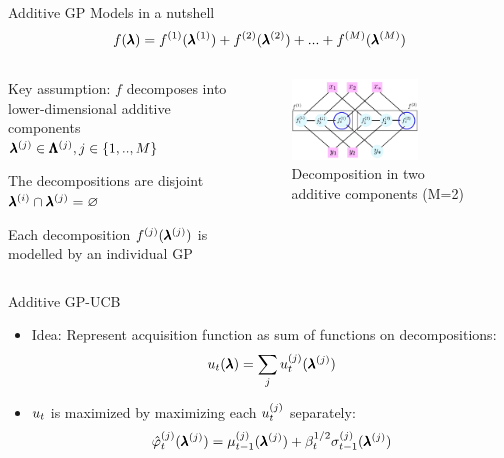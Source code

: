 \begin{frame}{Additive GP Models in a nutshell}
        \begin{equation*}
            f(\pmb{\lambda})=f^{(1)}(\pmb{\lambda}^{(1)})+f^{(2)}(\pmb{\lambda}^{(2)})+...+f^{(M)}(\pmb{\lambda}^{(M)})
        \end{equation*}
\begin{itemize}
\begin{columns}[T]
\begin{column}{0.45\linewidth}

\hspace{2em}
    \item Key assumption: $f$ decomposes into lower-dimensional additive components $\pmb{\lambda}^{(j)} \in \pmb{\Lambda}^{(j)}, j \in \{1,..,M\}$
    \item The decompositions are disjoint $\pmb{\lambda}^{(i)} \cap \pmb{\lambda}^{(j)} = \varnothing$
    \pause
    \item Each decomposition $f^{(j)}(\pmb{\lambda}^{(j)})$ is modelled by an individual GP
    \pause
    \end{column}
    \begin{column}{0.45\linewidth}
        \begin{figure}
    \includegraphics[width=0.7\textwidth]{images/highdim_images/additive-models.png}
    \caption{Decomposition in two additive components (M=2)}
    \end{figure}
    \end{column}
\end{columns}
\end{itemize}
\end{frame}
\begin{frame}{Additive GP-UCB}
\begin{itemize}

    \item Idea: Represent acquisition function as sum of functions on decompositions:
    \begin{equation*}
        u_{t}(\pmb{\lambda}) = \sum_{j}u_{t}^{(j)}(\pmb{\lambda}^{(j)})
    \end{equation*}
\pause
\medskip    
    \item $u_{t}$ is maximized by maximizing each $u_{t}^{(j)}$ separately:
    \begin{equation*}
        \hat{\varphi}_{t}^{(j)}(\pmb{\lambda}^{(j)}) = \mu_{t-1}^{(j)}(\pmb{\lambda}^{(j)}) + \beta_{t}^{1/2}\sigma_{t-1}^{(j)}(\pmb{\lambda}^{(j)})
    \end{equation*}
\end{itemize}
\end{frame}


